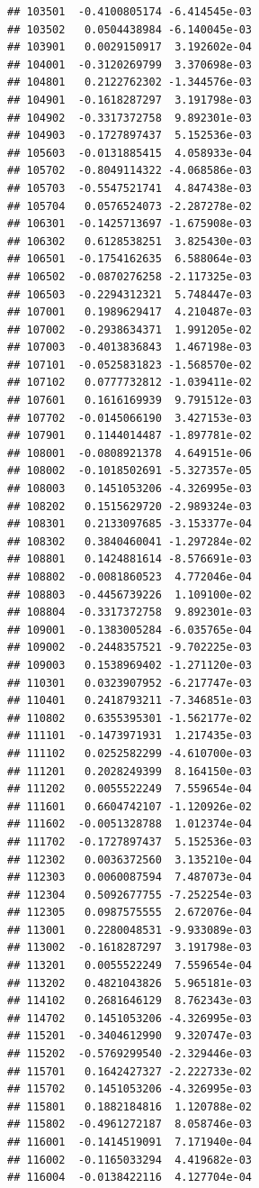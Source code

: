 \begin{frame}[fragile]
\begin{verbatim}
## 103501  -0.4100805174 -6.414545e-03
## 103502   0.0504438984 -6.140045e-03
## 103901   0.0029150917  3.192602e-04
## 104001  -0.3120269799  3.370698e-03
## 104801   0.2122762302 -1.344576e-03
## 104901  -0.1618287297  3.191798e-03
## 104902  -0.3317372758  9.892301e-03
## 104903  -0.1727897437  5.152536e-03
## 105603  -0.0131885415  4.058933e-04
## 105702  -0.8049114322 -4.068586e-03
## 105703  -0.5547521741  4.847438e-03
## 105704   0.0576524073 -2.287278e-02
## 106301  -0.1425713697 -1.675908e-03
## 106302   0.6128538251  3.825430e-03
## 106501  -0.1754162635  6.588064e-03
## 106502  -0.0870276258 -2.117325e-03
## 106503  -0.2294312321  5.748447e-03
## 107001   0.1989629417  4.210487e-03
## 107002  -0.2938634371  1.991205e-02
## 107003  -0.4013836843  1.467198e-03
## 107101  -0.0525831823 -1.568570e-02
## 107102   0.0777732812 -1.039411e-02
## 107601   0.1616169939  9.791512e-03
## 107702  -0.0145066190  3.427153e-03
## 107901   0.1144014487 -1.897781e-02
## 108001  -0.0808921378  4.649151e-06
## 108002  -0.1018502691 -5.327357e-05
## 108003   0.1451053206 -4.326995e-03
## 108202   0.1515629720 -2.989324e-03
## 108301   0.2133097685 -3.153377e-04
## 108302   0.3840460041 -1.297284e-02
## 108801   0.1424881614 -8.576691e-03
## 108802  -0.0081860523  4.772046e-04
## 108803  -0.4456739226  1.109100e-02
## 108804  -0.3317372758  9.892301e-03
## 109001  -0.1383005284 -6.035765e-04
## 109002  -0.2448357521 -9.702225e-03
## 109003   0.1538969402 -1.271120e-03
## 110301   0.0323907952 -6.217747e-03
## 110401   0.2418793211 -7.346851e-03
## 110802   0.6355395301 -1.562177e-02
## 111101  -0.1473971931  1.217435e-03
## 111102   0.0252582299 -4.610700e-03
## 111201   0.2028249399  8.164150e-03
## 111202   0.0055522249  7.559654e-04
## 111601   0.6604742107 -1.120926e-02
## 111602  -0.0051328788  1.012374e-04
## 111702  -0.1727897437  5.152536e-03
## 112302   0.0036372560  3.135210e-04
## 112303   0.0060087594  7.487073e-04
## 112304   0.5092677755 -7.252254e-03
## 112305   0.0987575555  2.672076e-04
## 113001   0.2280048531 -9.933089e-03
## 113002  -0.1618287297  3.191798e-03
## 113201   0.0055522249  7.559654e-04
## 113202   0.4821043826  5.965181e-03
## 114102   0.2681646129  8.762343e-03
## 114702   0.1451053206 -4.326995e-03
## 115201  -0.3404612990  9.320747e-03
## 115202  -0.5769299540 -2.329446e-03
## 115701   0.1642427327 -2.222733e-02
## 115702   0.1451053206 -4.326995e-03
## 115801   0.1882184816  1.120788e-02
## 115802  -0.4961272187  8.058746e-03
## 116001  -0.1414519091  7.171940e-04
## 116002  -0.1165033294  4.419682e-03
## 116004  -0.0138422116  4.127704e-04

\end{verbatim}
\end{frame}
